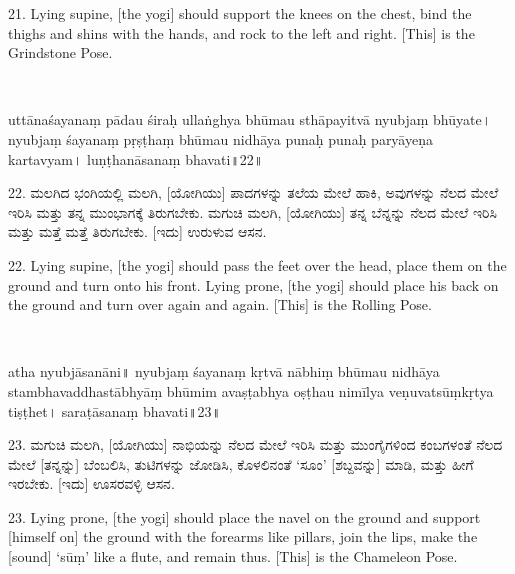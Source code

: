 \begin{eng}
21. Lying supine, [the yogi] should support the knees on the chest, bind the thighs and shins with the hands, and rock to the left and right. [This] is the Grindstone Pose.
\end{eng}
\newpage

~\vskip 1cm

\dummyimage
\begin{sans}
uttānaśayanaṃ pādau śiraḥ ullaṅghya bhūmau sthāpayitvā nyubjaṃ bhūyate\endnote{bhūyate~] \textit{emend.}, bhūyāt M.}। nyubjaṃ śayanaṃ pṛṣṭhaṃ bhūmau nidhāya punaḥ punaḥ paryāyeṇa kartavyam। luṇṭhanāsanaṃ bhavati॥22॥
\end{sans}
\bigskip

\begin{kan}
22.	ಮಲಗಿದ ಭಂಗಿಯಲ್ಲಿ ಮಲಗಿ, [ಯೋಗಿಯು] ಪಾದಗಳನ್ನು ತಲೆಯ ಮೇಲೆ ಹಾಕಿ, ಅವುಗಳನ್ನು ನೆಲದ ಮೇಲೆ ಇರಿಸಿ ಮತ್ತು ತನ್ನ ಮುಂಭಾಗಕ್ಕೆ ತಿರುಗಬೇಕು. ಮಗುಚಿ ಮಲಗಿ, [ಯೋಗಿಯು] ತನ್ನ ಬೆನ್ನನ್ನು ನೆಲದ ಮೇಲೆ ಇರಿಸಿ ಮತ್ತು ಮತ್ತೆ ಮತ್ತೆ ತಿರುಗಬೇಕು. [ಇದು] ಉರುಳುವ ಆಸನ.
\end{kan}
\bigskip

\begin{eng}
22. Lying supine, [the yogi] should pass the feet over the head, place them on the ground and turn onto his front. Lying prone, [the yogi] should place his back on the ground and turn over again and again. [This] is the Rolling Pose. 
\end{eng}
\newpage

~\vskip 1cm

\dummyimage
\begin{sans}
atha nyubjāsanāni॥ %
nyubjaṃ śayanaṃ kṛtvā nābhiṃ bhūmau nidhāya stambhavaddhastābhyāṃ bhūmim avaṣṭabhya oṣṭhau nimīlya veṇuvatsūṃkṛtya tiṣṭhet। saraṭāsanaṃ bhavati॥23॥
\end{sans}
\bigskip

\begin{kan}
23.	ಮಗುಚಿ ಮಲಗಿ, [ಯೋಗಿಯು] ನಾಭಿಯನ್ನು ನೆಲದ ಮೇಲೆ ಇರಿಸಿ ಮತ್ತು ಮುಂಗೈಗಳಿಂದ ಕಂಬಗಳಂತೆ ನೆಲದ ಮೇಲೆ [ತನ್ನನ್ನು] ಬೆಂಬಲಿಸಿ, ತುಟಿಗಳನ್ನು ಜೋಡಿಸಿ, ಕೊಳಲಿನಂತೆ `ಸೂಂ' [ಶಬ್ದವನ್ನು] ಮಾಡಿ, ಮತ್ತು ಹೀಗೆ ಇರಬೇಕು. [ಇದು] ಊಸರವಳ್ಳಿ ಆಸನ.
\end{kan}
\bigskip

\begin{eng}
23. Lying prone, [the yogi] should place the navel on the ground and support [himself on] the ground with the forearms like pillars, join the lips, make the [sound] `sūṃ' like a flute, and remain thus. [This] is the Chameleon Pose.
\end{eng}
\newpage

